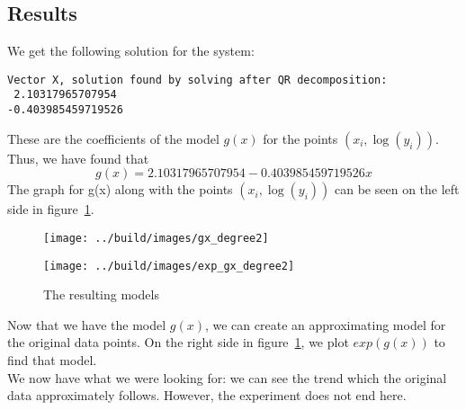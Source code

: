 \documentclass[11pt, a4paper, titlepage, openright]{article}
\begin{document}
    \newpage
    \subsection{Results}
    We get the following solution for the system:
\begin{lstlisting}
Vector X, solution found by solving after QR decomposition:
 2.10317965707954
-0.403985459719526
\end{lstlisting}
    These are the coefficients of the model \(g(x)\) for the points \((x_i, \log(y_i)) \). \\
    Thus, we have found that \[ g(x) = 2.10317965707954 - 0.403985459719526x\]
    The graph for g(x) along with the points \((x_i, \log(y_i)) \) can be seen on the left side in figure~\ref{fig:results}.
    \begin{figure}[H]
        \begin{minipage}[b]{0.49\textwidth}
            \texttt{[image: ../build/images/gx\_degree2]}
        \end{minipage}
        \hfill
        \begin{minipage}[b]{0.49\textwidth}
            \texttt{[image: ../build/images/exp\_gx\_degree2]}
        \end{minipage}
        \caption{The resulting models}
        \label{fig:results}
    \end{figure}
    
    Now that we have the model \(g(x)\), we can create an approximating model for the original data points.
    On the right side in figure~\ref{fig:results}, we plot \( exp(g(x)) \) to find that model. \\
    We now have what we were looking for: we can see the trend which the original data approximately follows. However, the experiment does not end here.
   
    \newpage
\end{document}
